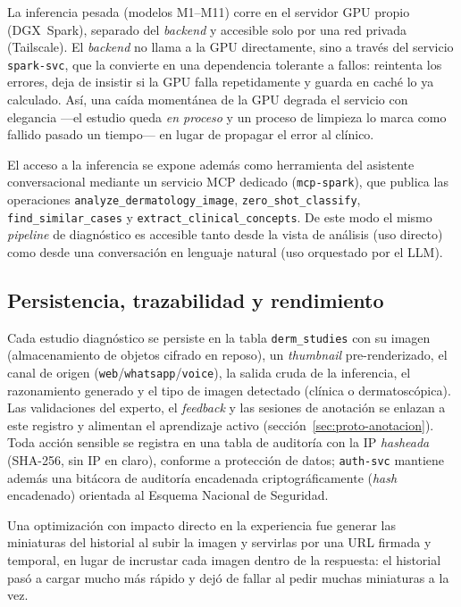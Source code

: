 La inferencia pesada (modelos M1--M11) corre en el servidor GPU propio
(DGX~Spark), separado del \emph{backend} y accesible solo por una red
privada (Tailscale). El \emph{backend} no llama a la GPU directamente,
sino a través del servicio \texttt{spark-svc}, que la convierte en una
dependencia tolerante a fallos: reintenta los errores, deja de insistir si
la GPU falla repetidamente y guarda en caché lo ya calculado. Así, una
caída momentánea de la GPU degrada el servicio con elegancia ---el estudio
queda \emph{en proceso} y un proceso de limpieza lo marca como fallido
pasado un tiempo--- en lugar de propagar el error al clínico.

El acceso a la inferencia se expone además como herramienta del asistente
conversacional mediante un servicio MCP dedicado
(\texttt{mcp-spark}), que publica las operaciones
\texttt{analyze\_dermatology\_image}, \texttt{zero\_shot\_classify},
\texttt{find\_similar\_cases} y \texttt{extract\_clinical\_concepts}. De
este modo el mismo \emph{pipeline} de diagnóstico es accesible tanto desde
la vista de análisis (uso directo) como desde una conversación en
lenguaje natural (uso orquestado por el LLM).

\subsection{Persistencia, trazabilidad y rendimiento}
\label{sec:proto-persistencia}

Cada estudio diagnóstico se persiste en la tabla \texttt{derm\_studies}
con su imagen (almacenamiento de objetos cifrado en reposo), un
\emph{thumbnail} pre-renderizado, el canal de origen
(\texttt{web}/\texttt{whatsapp}/\texttt{voice}), la salida cruda de la
inferencia, el razonamiento generado y el tipo de imagen detectado
(clínica o dermatoscópica). Las validaciones del experto, el
\emph{feedback} y las sesiones de anotación se enlazan a este registro y
alimentan el aprendizaje activo (sección~\ref{sec:proto-anotacion}). Toda
acción sensible se registra en una tabla de auditoría con la IP
\emph{hasheada} (SHA-256, sin IP en claro), conforme a protección de
datos; \texttt{auth-svc} mantiene además una bitácora de auditoría
encadenada criptográficamente (\emph{hash} encadenado) orientada al
Esquema Nacional de Seguridad.

Una optimización con impacto directo en la experiencia fue generar las
miniaturas del historial al subir la imagen y servirlas por una URL
firmada y temporal, en lugar de incrustar cada imagen dentro de la
respuesta: el historial pasó a cargar mucho más rápido y dejó de fallar al
pedir muchas miniaturas a la vez.

